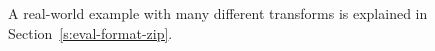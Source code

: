 \noindent A real-world example with many different transforms is explained in Section~\ref{s:eval-format-zip}.
 






